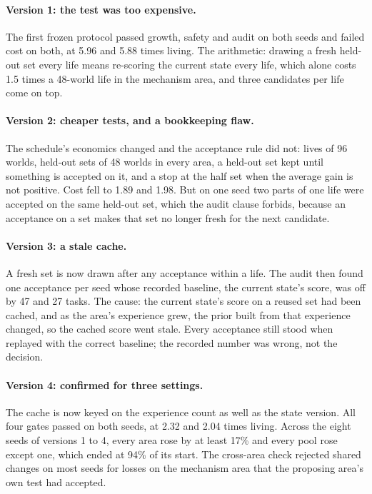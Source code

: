\documentclass[11pt]{article}
\begin{document}
\paragraph{Version 1: the test was too expensive.} The first frozen protocol passed growth, safety and audit on both seeds and failed cost on both, at 5.96 and 5.88 times living. The arithmetic: drawing a fresh held-out set every life means re-scoring the current state every life, which alone costs 1.5 times a 48-world life in the mechanism area, and three candidates per life come on top.

\paragraph{Version 2: cheaper tests, and a bookkeeping flaw.} The schedule's economics changed and the acceptance rule did not: lives of 96 worlds, held-out sets of 48 worlds in every area, a held-out set kept until something is accepted on it, and a stop at the half set when the average gain is not positive. Cost fell to 1.89 and 1.98. But on one seed two parts of one life were accepted on the same held-out set, which the audit clause forbids, because an acceptance on a set makes that set no longer fresh for the next candidate.

\paragraph{Version 3: a stale cache.} A fresh set is now drawn after any acceptance within a life. The audit then found one acceptance per seed whose recorded baseline, the current state's score, was off by 47 and 27 tasks. The cause: the current state's score on a reused set had been cached, and as the area's experience grew, the prior built from that experience changed, so the cached score went stale. Every acceptance still stood when replayed with the correct baseline; the recorded number was wrong, not the decision.

\paragraph{Version 4: confirmed for three settings.} The cache is now keyed on the experience count as well as the state version. All four gates passed on both seeds, at 2.32 and 2.04 times living. Across the eight seeds of versions 1 to 4, every area rose by at least 17\% and every pool rose except one, which ended at 94\% of its start. The cross-area check rejected shared changes on most seeds for losses on the mechanism area that the proposing area's own test had accepted.
\end{document}
